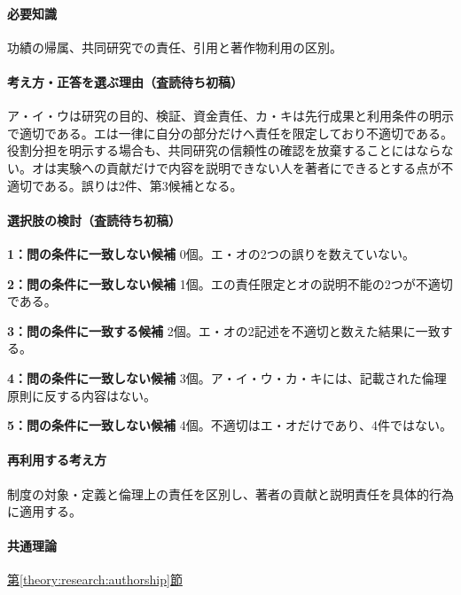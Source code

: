 \paragraph{必要知識} 功績の帰属、共同研究での責任、引用と著作物利用の区別。

\paragraph{考え方・正答を選ぶ理由（査読待ち初稿）} ア・イ・ウは研究の目的、検証、資金責任、カ・キは先行成果と利用条件の明示で適切である。エは一律に自分の部分だけへ責任を限定しており不適切である。役割分担を明示する場合も、共同研究の信頼性の確認を放棄することにはならない。オは実験への貢献だけで内容を説明できない人を著者にできるとする点が不適切である。誤りは2件、第3候補となる。

\paragraph{選択肢の検討（査読待ち初稿）}\mbox{}\par

\noindent\textbf{1：問の条件に一致しない候補} 0個。エ・オの2つの誤りを数えていない。\par

\noindent\textbf{2：問の条件に一致しない候補} 1個。エの責任限定とオの説明不能の2つが不適切である。\par

\noindent\textbf{3：問の条件に一致する候補} 2個。エ・オの2記述を不適切と数えた結果に一致する。\par

\noindent\textbf{4：問の条件に一致しない候補} 3個。ア・イ・ウ・カ・キには、記載された倫理原則に反する内容はない。\par

\noindent\textbf{5：問の条件に一致しない候補} 4個。不適切はエ・オだけであり、4件ではない。\par

\paragraph{再利用する考え方} 制度の対象・定義と倫理上の責任を区別し、著者の貢献と説明責任を具体的行為に適用する。

\paragraph{共通理論} \hyperref[theory:research:authorship]{第\ref*{theory:research:authorship}節}

